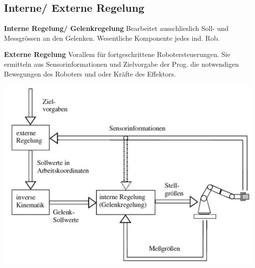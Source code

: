 \begin{minipage}{0.5\linewidth}
    \subsection{Interne/ Externe Regelung}
    \textbf{Interne Regelung/ Gelenkregelung}\newline
    Bearbeitet ausschlieslich Soll- und Messgrössen an den Gelenken.
    Wesentliche Komponente jedes ind. Rob.
    
    \textbf{Externe Regelung}\newline
    Vorallem für fortgeschrittene Robotersteuerungen. Sie ermitteln aus Sensorinformationen und Zielvorgabe der Prog. die notwendigen Bewegungen des Roboters und oder Kräfte des Effektors.
\end{minipage}
\begin{minipage}{0.5\linewidth}
    \includegraphics[width=\linewidth]{./bilder/InternExternRegelung}
\end{minipage}

